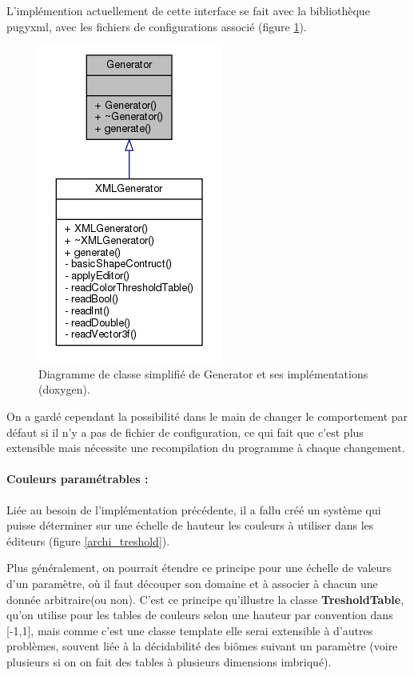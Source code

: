 \documentclass[a4paper]{article}
\begin{document}
L'implémention actuellement de cette interface se fait avec la bibliothèque pugyxml, avec les fichiers de configurations associé (figure \ref{archi_generator}).
    \begin{figure}[!h]
        \begin{center} \includegraphics[width=0.3\linewidth]{img/archi/archi_generator.png}\end{center}
        \caption{\label{archi_generator}Diagramme de classe simplifié de Generator et ses implémentations (doxygen).}
    \end{figure}
    
On a gardé cependant la possibilité dans le main de changer le comportement par défaut si il n'y a pas de fichier de configuration, ce qui fait que c'est plus extensible mais nécessite une recompilation du programme à chaque changement.

\paragraph{Couleurs paramétrables :}

Liée au besoin de l'implémentation précédente, il a fallu créé un système qui puisse déterminer sur une échelle de hauteur les couleurs à utiliser dans les éditeurs (figure \ref{archi_treshold}).

Plus généralement, on pourrait étendre ce principe pour une échelle de valeurs d'un paramètre, où il faut découper son domaine et à associer à chacun une donnée arbitraire(ou non). C'est ce principe qu'illustre la classe \textbf{TresholdTable}, qu'on utilise pour les tables de couleurs selon une hauteur par convention dans [-1,1], mais comme c'est une classe template elle serai extensible à d'autres problèmes, souvent liée à la décidabilité des biômes suivant un paramètre (voire plusieurs si on on fait des tables à plusieurs dimensions imbriqué).
\end{document}
